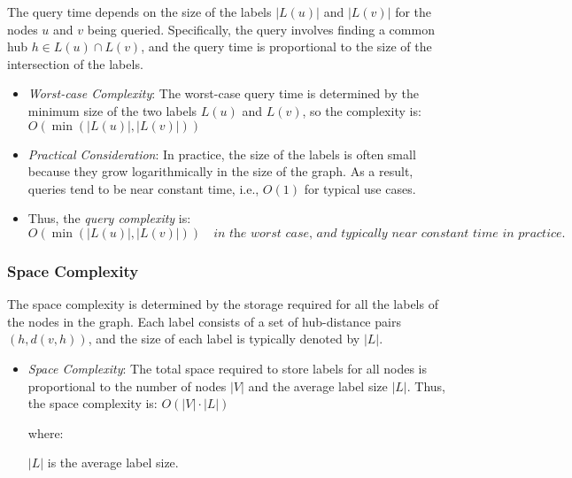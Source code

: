 \begin{appendices}
	The query time depends on the size of the labels $ |L(u)| $ and $|L(v)| $ for the nodes $ u $ and $ v $ being queried. Specifically, the query involves finding a common hub $ h \in L(u) \cap L(v) $, and the query time is proportional to the size of the intersection of the labels. 
	
	\begin{itemize}
	
	\item \textit{Worst-case Complexity}: The worst-case query time is determined by the minimum size of the two labels $ L(u) $ and $ L(v) $, so the complexity is:
	$
	O(\min(|L(u)|, |L(v)|))
	$
	
	\item\textit{Practical Consideration}: In practice, the size of the labels is often small because they grow logarithmically in the size of the graph. As a result, queries tend to be near constant time, i.e., $ O(1) $ for typical use cases.
	
	\item Thus, the \textit{query complexity} is:
	$
	O(\min(|L(u)|, |L(v)|)) \quad \textit{in the worst case, and typically near constant time in practice.}
	$
	
	\end{itemize}
	
	\subsubsection{Space Complexity}
	
	The space complexity is determined by the storage required for all the labels of the nodes in the graph. Each label consists of a set of hub-distance pairs $ (h, d(v, h)) $, and the size of each label is typically denoted by $|L| $.
	
	\begin{itemize}
	\item	\textit{Space Complexity}: The total space required to store labels for all nodes is proportional to the number of nodes $|V|$ and the average label size $ |L| $. Thus, the space complexity is:	$ O(|V| \cdot |L|) $ 
	
	where:
	
	 $|L| $ is the average label size.
	
	\end{itemize}
	
	

	
	
	
	
	
\end{appendices}